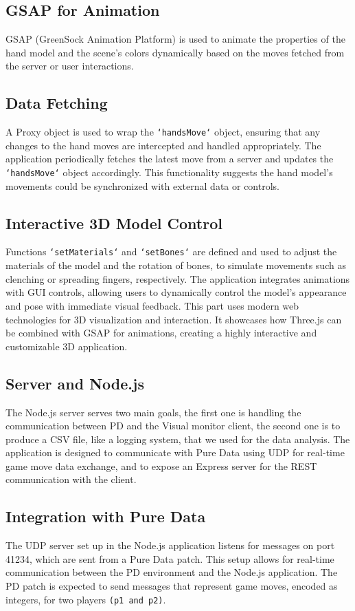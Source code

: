 \documentclass[11pt,a4paper]{report}
\begin{document}
\subsection*{GSAP for Animation}
GSAP (GreenSock Animation Platform) is used to animate the properties of the hand model and the scene's colors dynamically based on the moves fetched from the server or user interactions.

\subsection*{Data Fetching}
A Proxy object is used to wrap the \texttt{`handsMove`} object, ensuring that any changes to the hand moves are intercepted and handled appropriately.
The application periodically fetches the latest move from a server and updates the \texttt{`handsMove`} object accordingly. This functionality suggests the hand model's movements could be synchronized with external data or controls.

\subsection*{Interactive 3D Model Control}
Functions \texttt{`setMaterials`} and \texttt{`setBones`} are defined and used to adjust the materials of the model and the rotation of bones, to simulate movements such as clenching or spreading fingers, respectively.
The application integrates animations with GUI controls, allowing users to dynamically control the model's appearance and pose with immediate visual feedback.
This part uses modern web technologies for 3D visualization and interaction. It showcases how Three.js can be combined with GSAP for animations, creating a highly interactive and customizable 3D application. 

\subsection*{Server and Node.js}
The Node.js server serves two main goals, the first one is handling the communication between PD and the Visual monitor client, the second one is to produce a CSV file, like a logging system, that we used for the data analysis. 
The application is designed to communicate with Pure Data using UDP for real-time game move data exchange, and to expose an Express server for the REST communication with the client.

\subsection*{Integration with Pure Data}
The UDP server set up in the Node.js application listens for messages on port 41234, which are sent from a Pure Data patch. This setup allows for real-time communication between the PD environment and the Node.js application. The PD patch is expected to send messages that represent game moves, encoded as integers, for two players \texttt{(p1 and p2)}.
\end{document}
